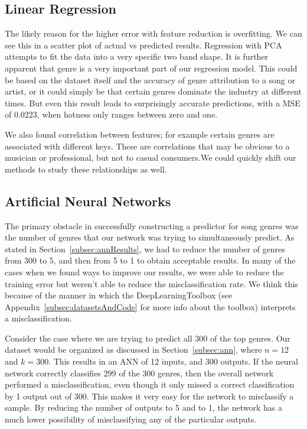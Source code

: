\documentclass[12pt]{article}
\begin{document}
\subsection{Linear Regression}
\label{subsec:linearRegressionDisc}
The likely reason for the higher error with feature reduction is overfitting. We can see this in a scatter plot of actual vs predicted results. Regression with PCA attempts to fit the data into a very specific two band shape. It is further apparent that genre is a very important part of our regression model. This could be based on the dataset itself and the accuracy of genre attribution to a song or artist, or it could simply be that certain genres dominate the industry at different times. But even this result leads to surprisingly accurate predictions, with a MSE of 0.0223, when hotness only ranges between zero and one.

We also found correlation between features; for example certain genres are associated with different keys. These are correlations that may be obvious to a musician or professional, but not to casual consumers.We could quickly shift our methods to study these relationships as well.
\subsection{Artificial Neural Networks}
\label{subsec:annDisc}
The primary obstacle in successfully constructing a predictor for song genres was the number of genres that our network was trying to simultaneously predict. As stated in Section~\ref{subsec:annResults}, we had to reduce the number of genres from 300 to 5, and then from 5 to 1 to obtain acceptable results. In many of the cases when we found ways to improve our results, we were able to reduce the training error but weren't able to reduce the misclassification rate. We think this because of the manner in which the DeepLearningToolbox (see Appendix~\ref{subsec:datasetsAndCode} for more info about the toolbox) interprets a misclassification. 

Consider the case where we are trying to predict all 300 of the top genres. Our dataset would be organized as discussed in Section~\ref{subsec:ann}, where $n = 12$ and $k = 300$. This results in an ANN of 12 inputs, and 300 outputs. If the neural network correctly classifies 299 of the 300 genres, then the overall network performed a misclassification, even though it only missed a correct classification by 1 output out of 300. This makes it very easy for the network to misclassify a sample. By reducing the number of outputs to 5 and to 1, the network has a much lower possibility of misclassifying any of the particular outputs. 
\end{document}
